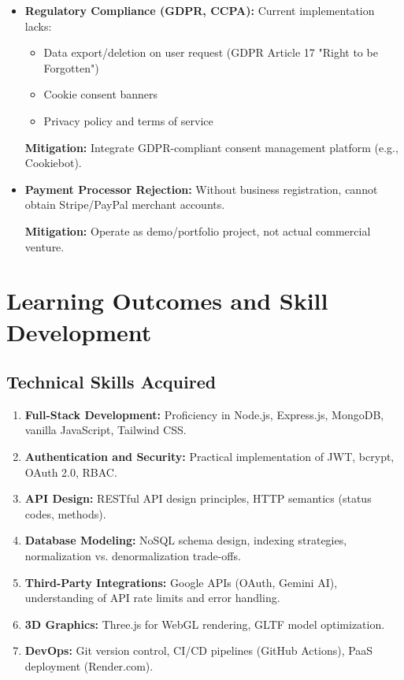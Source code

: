 \documentclass[12pt, a4paper]{report}
\begin{document}
\begin{itemize}
    \item \textbf{Regulatory Compliance (GDPR, CCPA):} Current implementation lacks:
    \begin{itemize}
        \item Data export/deletion on user request (GDPR Article 17 "Right to be Forgotten")
        \item Cookie consent banners
        \item Privacy policy and terms of service
    \end{itemize}
    
    \textbf{Mitigation:} Integrate GDPR-compliant consent management platform (e.g., Cookiebot).
    
    \item \textbf{Payment Processor Rejection:} Without business registration, cannot obtain Stripe/PayPal merchant accounts.
    
    \textbf{Mitigation:} Operate as demo/portfolio project, not actual commercial venture.
\end{itemize}

\section{Learning Outcomes and Skill Development}

\subsection{Technical Skills Acquired}

\begin{enumerate}
    \item \textbf{Full-Stack Development:} Proficiency in Node.js, Express.js, MongoDB, vanilla JavaScript, Tailwind CSS.
    \item \textbf{Authentication and Security:} Practical implementation of JWT, bcrypt, OAuth 2.0, RBAC.
    \item \textbf{API Design:} RESTful API design principles, HTTP semantics (status codes, methods).
    \item \textbf{Database Modeling:} NoSQL schema design, indexing strategies, normalization vs. denormalization trade-offs.
    \item \textbf{Third-Party Integrations:} Google APIs (OAuth, Gemini AI), understanding of API rate limits and error handling.
    \item \textbf{3D Graphics:} Three.js for WebGL rendering, GLTF model optimization.
    \item \textbf{DevOps:} Git version control, CI/CD pipelines (GitHub Actions), PaaS deployment (Render.com).
\end{enumerate}
\end{document}
